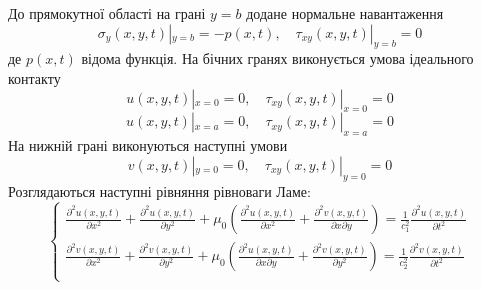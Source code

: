 До прямокутної області на грані $y=b$ додане нормальне навантаження
\begin{equation}
    \sigma_y(x, y, t) |_{y=b} = -p(x, t), \quad  \tau_{xy}(x,y,t) |_{y=b} =0
\end{equation}
де $p(x,t)$ відома функція.
На бічних гранях виконується умова ідеального контакту
\begin{equation}
    u(x,y,t) |_{x=0} = 0, \quad \tau_{xy}(x,y,t) |_{x=0} =0
\end{equation}
\begin{equation}
    u(x,y,t) |_{x=a} = 0, \quad \tau_{xy}(x,y,t) |_{x=a} =0
\end{equation}
На нижній грані виконуються наступні умови
\begin{equation}
    v(x,y,t) |_{y=0} = 0, \quad \tau_{xy}(x,y,t) |_{y=0} =0
\end{equation}
Розглядаються наступні рівняння рівноваги Ламе:
\begin{equation}
    \begin{cases}
        \frac{\partial^2 u(x,y,t)}{\partial x^2} + \frac{\partial^2 u(x,y,t)}{\partial y^2} + \mu_0 (\frac{\partial^2 u(x,y,t)}{\partial x^2} + \frac{\partial^2 v(x,y,t)}{\partial x\partial y}) = \frac{1}{c_1^2} \frac{\partial^2 u(x,y,t)}{\partial t^2} \\
        \frac{\partial^2 v(x,y,t)}{\partial x^2} + \frac{\partial^2 v(x,y,t)}{\partial y^2} + \mu_0 (\frac{\partial^2 u(x,y,t)}{\partial x \partial y} + \frac{\partial^2 v(x,y,t)}{\partial y^2}) = \frac{1}{c_2^2} \frac{\partial^2 v(x,y,t)}{\partial t^2} \\
    \end{cases}
\end{equation}

